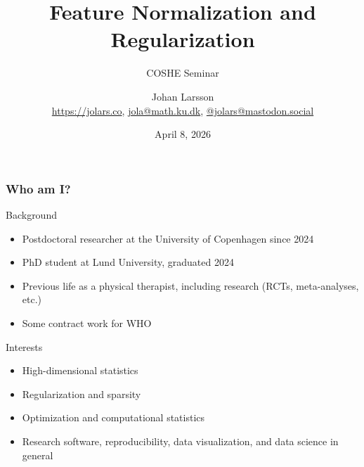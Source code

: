 \documentclass[onlytextwidth,aspectratio=1610]{beamer}
\title{Feature Normalization and Regularization}
\subtitle{COSHE Seminar}
\author{%
  Johan Larsson\\\smallskip%
  \scriptsize\url{https://jolars.co},
  \href{mailto:jola@math.ku.dk}{jola@math.ku.dk},
  \href{https://mastodon.social/@jolars}{@jolars@mastodon.social}
}
\institute{Department of Mathematical Sciences, Copenhagen University}
\date{April 8, 2026}
\begin{document}
\maketitle

\begin{frame}
  \frametitle{Who am I?}

  \begin{block}{Background}
    \begin{itemize}
      \item Postdoctoral researcher at the University of Copenhagen since 2024
      \item PhD student at Lund University, graduated 2024
      \item Previous life as a physical therapist, including research (RCTs,
            meta-analyses, etc.)
      \item Some contract work for WHO
    \end{itemize}
  \end{block}

  \pause

  \begin{block}{Interests}
    \begin{itemize}
      \item High-dimensional statistics
      \item Regularization and sparsity
      \item Optimization and computational statistics
      \item Research software, reproducibility, data visualization, and data
            science in general
    \end{itemize}
  \end{block}

\end{frame}
\end{document}
